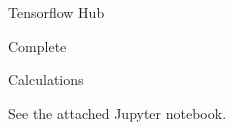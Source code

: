 \documentclass[11pt]{article}
\begin{document}
Tensorflow Hub
\begin{solution}
	Complete
\end{solution}

Calculations
\begin{solution}
	See the attached Jupyter notebook.
\end{solution}
\end{document}

